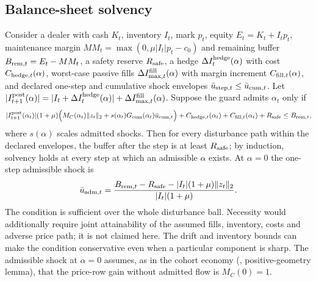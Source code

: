 \subsection{Balance-sheet solvency}

\begin{theorem}\label{thm:forward}
Consider a dealer with cash $K_t$, inventory $I_t$, mark $p_t$, equity $E_t=K_t+I_tp_t$, maintenance margin $MM_t=\max(0,\mu|I_t|p_t-c_0)$ and remaining buffer $B_{{\rm rem},t}=E_t-MM_t$, a safety reserve $R_{\rm safe}$, a hedge $\Delta I^{\rm hedge}_t(\alpha)$ with cost $C_{{\rm hedge},t}(\alpha)$, worst-case passive fills $\Delta I^{\rm fill}_{\max,t}(\alpha)$ with margin increment $C_{{\rm fill},t}(\alpha)$, and declared one-step and cumulative shock envelopes $\bar u_{{\rm step},t}\le\bar u_{{\rm cum},t}$. Let $|I^{\rm post}_{t+1}(\alpha)|=|I_t+\Delta I^{\rm hedge}_t(\alpha)|+\Delta I^{\rm fill}_{\max,t}(\alpha)$. Suppose the guard admits $\alpha_t$ only if
\begin{equation}\label{eq:guardineq}
|I^{\rm post}_{t+1}(\alpha_t)|(1+\mu)\Bigl(M_{C}(\alpha_t)\|z_t\|_2+s(\alpha_t)G_{\rm cum}(\alpha_t)\bar u_{{\rm cum},t}\Bigr)+C_{{\rm hedge},t}(\alpha_t)+C_{{\rm fill},t}(\alpha_t)+R_{\rm safe}\le B_{{\rm rem},t},
\end{equation}
where $s(\alpha)$ scales admitted shocks. Then for every disturbance path within the declared envelopes, the buffer after the step is at least $R_{\rm safe}$; by induction, solvency holds at every step at which an admissible $\alpha$ exists. At $\alpha=0$ the one-step admissible shock is
\[
\bar u_{{\rm adm},t}=\frac{B_{{\rm rem},t}-R_{\rm safe}-|I_t|(1+\mu)\|z_t\|_2}{|I_t|(1+\mu)} .
\]
The condition is sufficient over the whole disturbance ball. Necessity would additionally require joint attainability of the assumed fills, inventory, costs and adverse price path; it is not claimed here. The drift and inventory bounds can make the condition conservative even when a particular component is sharp. The admissible shock at $\alpha=0$ assumes, as in the cohort economy (\citealp{niroula2026}, positive-geometry lemma), that the price-row gain without admitted flow is $M_C(0)=1$.
\end{theorem}

